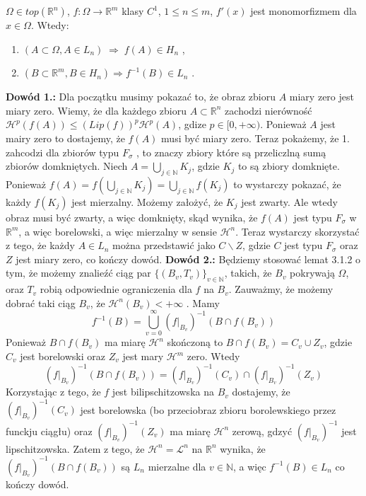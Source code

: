 \begin{tw}
	$\Omega \in top(\mathbb{R}^n)$, $f: \Omega \rightarrow \mathbb{R}^m$ klasy $C^1$, $1 \leq n \leq m$, $f'(x)$ jest monomorfizmem dla $x \in \Omega$. Wtedy:
	\begin{enumerate}	
		\item $(A \subset \Omega, A \in L_n) \; \Longrightarrow \; f(A) \in H_n$ ,
		\item $(B \subset \mathbb{R}^m, B \in H_n) \Longrightarrow f^{-1}(B) \in L_n$ .
	\end{enumerate}

	\textbf{Dowód 1.:}\newline
		Dla początku musimy pokazać to, że obraz zbioru $A$ miary zero jest miary zero. Wiemy, że dla każdego zbioru $A \subset \mathbb{R}^n$ zachodzi nierówność $\mathcal{H}^p(f(A)) \leq (Lip(f))^p \mathcal{H}^p(A)$, gdize $p \in [0, +\infty)$. Ponieważ $A$ jest mairy zero to dostajemy, że $f(A)$ musi być miary zero. 
		Teraz pokażemy, że 1. zahcodzi dla zbiorów typu $F_{\sigma}$ , to znaczy zbiory które są przeliczlną sumą zbiorów domkniętych. Niech $A = \bigcup_{j \in \mathbb{N}} K_j$, gdzie $K_j$ to są zbiory domknięte. Ponieważ $f(A) = f(\bigcup_{j \in \mathbb{N}} K_j) = \bigcup_{j \in \mathbb{N}} f(K_j)$ to wystarczy pokazać, że każdy $f(K_j)$ jest mierzalny. Możemy założyć, że $K_j$ jest zwarty. Ale wtedy obraz musi być zwarty, a więc domknięty, skąd wynika, że $f(A)$ jest typu $F_{\sigma}$ w $\mathbb{R}^m$, a więc borelowski, a więc mierzalny w sensie $\mathcal{H}^n$. 
		Teraz wystarczy skorzystać z tego, że każdy $A \in L_n$ można przedstawić jako $C \backslash Z$, gdzie $C$ jest typu $F_{\sigma}$ oraz $Z$ jest miary zero, co kończy dowód.
	\newline
	\textbf{Dowód 2.:}\newline
		Będziemy stosować lemat 3.1.2 o tym, że możemy znalieźć ciąg par $\{(B_v, T_v)\}_{v \in \mathbb{N}}$, takich, że $B_v$ pokrywają $\Omega$, oraz $T_v$ robią odpowiednie ograniczenia dla $f$ na $B_v$. Zauważmy, że możemy dobrać taki ciąg $B_v$, że $\mathcal{H}^n(B_v) < + \infty$ . Mamy $$ 
			f^{-1}(B) = \bigcup_{v=0}^{\infty} (f|_{B_v})^{-1} (B \cap f(B_v))
		$$
		Ponieważ $B \cap f(B_v)$ ma miarę $\mathcal{H}^n$ skończoną to $B \cap f(B_v) = C_v \cup Z_v$, gdzie $C_v$ jest borelowski oraz $Z_v$ jest mary $\mathcal{H}^m$ zero. Wtedy $$ 
			(f|_{B_v})^{-1}(B \cap f(B_v)) = (f|_{B_v})^{-1}(C_v) \cap (f|_{B_v})^{-1}(Z_v)
		$$
		Korzystając z tego, że $f$ jest bilipschitzowska na $B_v$ dostajemy, że $(f|_{B_v})^{-1}(C_v)$ jest borelowska (bo przeciobraz zbioru borolewskiego przez funckju ciągłu) oraz $(f|_{B_v})^{-1}(Z_v)$ ma miarę $\mathcal{H}^n$ zerową, gdzyć $(f|_{B_v})^{-1}$ jest lipschitzowska. Zatem z tego, że $\mathcal{H}^n = \mathcal{L}^n$ na $\mathbb{R}^n$ wynika, że $(f|_{B_v})^{-1}(B \cap f(B_v))$ są $L_n$ mierzalne dla $v \in \mathbb{N}$, a więc $f^{-1}(B) \in L_n$ co kończy dowód. 
\end{tw}